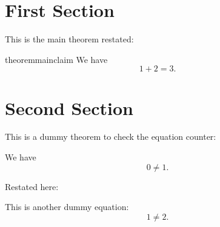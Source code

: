 \section{First Section}

This is the main theorem restated:
\begin{restatable}{theorem}{mainclaim}
    We have
    \begin{equation}
        1 + 2 = 3 .
    \end{equation}
\end{restatable}

\section{Second Section}

This is a dummy theorem to check the equation counter:
\begin{theorem} We have
    \begin{equation}
        0 \neq 1 .
    \end{equation}
\end{theorem}

Restated here:
\mainclaim*

This is another dummy equation:
\begin{equation}
    1 \neq 2 .
\end{equation}
